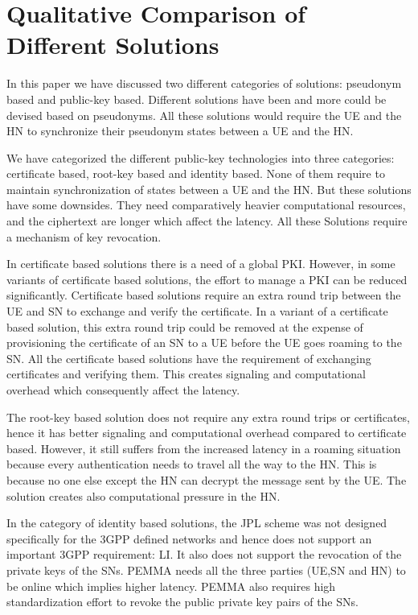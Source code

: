 \documentclass{river-journal}
\begin{document}
\section{Qualitative Comparison of Different Solutions}
\label{sec:evaluation}
In this paper we have discussed two different categories of solutions: pseudonym based and public-key based. Different solutions \cite{pseudonym_valtteri_philip,pseudonym_ericsson,CCS15,SSR15} have been and more could be devised based on pseudonyms. All these solutions would require the UE and the HN to synchronize their pseudonym states between a UE and the HN.

We have categorized the different public-key technologies into three categories: certificate based, root-key based and identity based. None of them require to maintain synchronization of states between a UE and the HN. But these solutions have some downsides. They need comparatively heavier computational resources, and the ciphertext are longer which affect the latency. All these Solutions require a mechanism of key revocation.

In certificate based solutions there is a need of a global PKI. However, in some variants of certificate based solutions, the effort to manage a PKI can be reduced significantly. Certificate based solutions require an extra round trip between the UE and SN to exchange and verify the certificate. In a variant of a certificate based solution, this extra round trip could be removed at the expense of provisioning the certificate of an SN to a UE before the UE goes roaming to the SN. All the certificate based solutions have the requirement of exchanging certificates and verifying them. This creates signaling and computational overhead which consequently affect the latency. 

The root-key based solution does not require any extra round trips or certificates, hence it has better signaling and computational overhead compared to certificate based. However, it still suffers from the increased latency in a roaming situation because every authentication needs to travel all the way to the HN. This is because no one else except the HN can decrypt the message sent by the UE. The solution creates also computational pressure in the HN. 

In the category of identity based solutions, the JPL scheme was not designed specifically for the 3GPP defined networks and hence does not support an important 3GPP requirement: LI. It also does not support the revocation of the private keys of the SNs. PEMMA needs all the three parties (UE,SN and HN) to be online which implies higher latency. PEMMA also requires high standardization effort to revoke the public private key pairs of the SNs.
\end{document}
